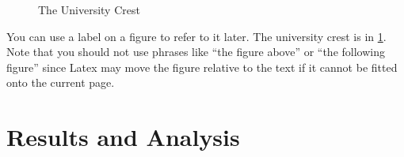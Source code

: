 \documentclass[12pt,a4paper]{article}
\begin{document}
\begin{figure}

\begin{center}
\end{center}

\caption{The University Crest}
\label{fig:eucrest}

\end{figure}





You can use a label on a figure to refer to it later. The university
crest is in \ref{fig:eucrest}. Note that you should not use phrases like
``the figure above'' or ``the following figure'' since Latex may move
the figure relative to the text if it cannot be fitted onto the current page.

\section{Results and Analysis}
\end{document}
